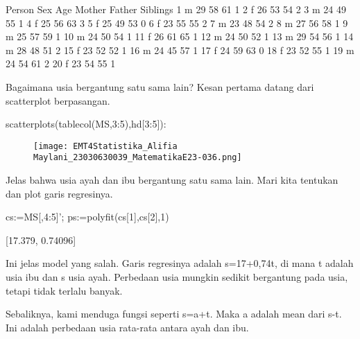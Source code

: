 \documentclass{article}
\begin{document}
        Person       Sex       Age    Mother    Father  Siblings
             1         m        29        58        61         1
             2         f        26        53        54         2
             3         m        24        49        55         1
             4         f        25        56        63         3
             5         f        25        49        53         0
             6         f        23        55        55         2
             7         m        23        48        54         2
             8         m        27        56        58         1
             9         m        25        57        59         1
            10         m        24        50        54         1
            11         f        26        61        65         1
            12         m        24        50        52         1
            13         m        29        54        56         1
            14         m        28        48        51         2
            15         f        23        52        52         1
            16         m        24        45        57         1
            17         f        24        59        63         0
            18         f        23        52        55         1
            19         m        24        54        61         2
            20         f        23        54        55         1

Bagaimana usia bergantung satu sama lain? Kesan pertama datang dari
scatterplot berpasangan.


\>scatterplots(tablecol(MS,3:5),hd[3:5]):


\begin{figure}
    \centering
    \texttt{[image: EMT4Statistika\_Alifia Maylani\_23030630039\_MatematikaE23-036.png]}
    \caption{}
    \label{fig:enter-label}
\end{figure}

Jelas bahwa usia ayah dan ibu bergantung satu sama lain. Mari kita
tentukan dan plot garis regresinya.


\>cs:=MS[,4:5]'; ps:=polyfit(cs[1],cs[2],1)


    [17.379,  0.74096]

Ini jelas model yang salah. Garis regresinya adalah s=17+0,74t, di
mana t adalah usia ibu dan s usia ayah. Perbedaan usia mungkin sedikit
bergantung pada usia, tetapi tidak terlalu banyak.


Sebaliknya, kami menduga fungsi seperti s=a+t. Maka a adalah mean dari
s-t. Ini adalah perbedaan usia rata-rata antara ayah dan ibu.
\end{document}
